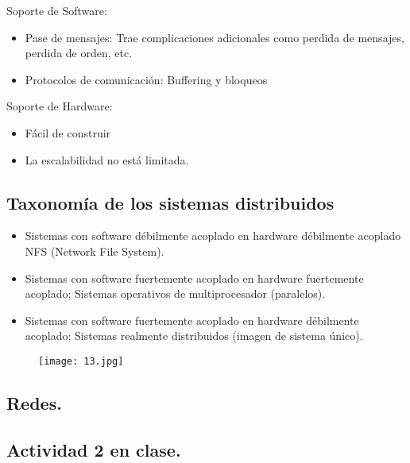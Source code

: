 Soporte de Software:

\begin{itemize}
	\item Pase de mensajes: Trae complicaciones adicionales como perdida de mensajes, perdida de orden, etc.
	\item Protocolos de comunicación: Buffering y bloqueos
\end{itemize}

Soporte de Hardware:

\begin{itemize}
	\item Fácil de construir
	\item La escalabilidad no está limitada.
\end{itemize}

\begin{center}
\subsection{Taxonomía de los sistemas distribuidos}
\end{center}

\begin{itemize}
	\item Sistemas con software débilmente acoplado en hardware débilmente acoplado NFS (Network File System).
	\item Sistemas con software fuertemente acoplado en hardware fuertemente acoplado; Sistemas operativos de multiprocesador (paralelos).
	\item Sistemas con software fuertemente acoplado en hardware débilmente acoplado; Sistemas realmente distribuidos (imagen de sistema único).
\end{itemize}

\begin{figure}[h!]
		\centering
		{\texttt{[image: 13.jpg]}\par} \vspace{1cm}
\end{figure}
\newpage

\begin{center}
\section{Redes.}
\end{center}

{\raggedright
\subsection{Actividad 2 en clase.}
}

